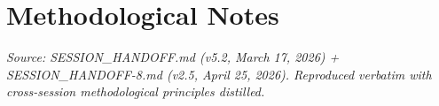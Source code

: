 \part{Methodological Notes}
\noindent\textit{Source: SESSION\_HANDOFF.md (v5.2, March 17, 2026)
+ SESSION\_HANDOFF-8.md (v2.5, April 25, 2026). Reproduced
verbatim with cross-session methodological principles distilled.}


